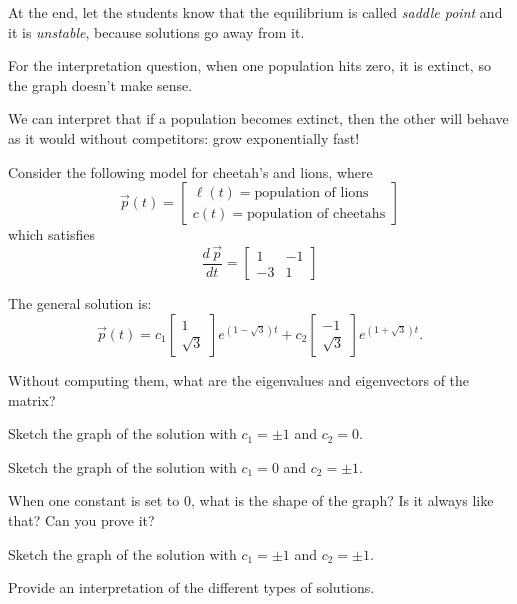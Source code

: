 \begin{annotation}
	\begin{goals}
	\end{goals}
	\begin{goals}
	\Goal{Unstable Saddle Point}
	At the end, let the students know that the equilibrium is called \emph{saddle point} and it is \emph{unstable}, because solutions go away from it.
	
	For the interpretation question, when one population hits zero, it is extinct, so the graph doesn't make sense. 
	
	We can interpret that if a population becomes extinct, then the other will behave as it would without competitors: grow exponentially fast!
	\end{goals}
\end{annotation}
\question \label{sys:phaseportrait-real}
	Consider the following model for cheetah's and lions, where
	$$ \vec{p}(t) = \begin{bmatrix} \ell(t) = \text{population of lions} \\ c(t) = \text{population of cheetahs} \end{bmatrix} $$
	which satisfies
	$$
	\frac{d\,\vec{p}}{dt} = \begin{bmatrix}
 		1 & -1 \\
 		-3 & 1
 	\end{bmatrix}
	$$
	
	The general solution is:
	$$
	\vec{p}(t) = c_1 \begin{bmatrix} 1 \\ \sqrt{3} \end{bmatrix} e^{(1-\sqrt{3})t} + c_2 \begin{bmatrix} -1 \\ \sqrt{3} \end{bmatrix} e^{(1+\sqrt{3})t}.
	$$
\begin{parts}
	\item Without computing them, what are the eigenvalues and eigenvectors of the matrix?
	\item Sketch the graph of the solution with $c_1=\pm 1$ and $c_2=0$.
	\item Sketch the graph of the solution with $c_1=0$ and $c_2=\pm 1$.
	\item When one constant is set to 0, what is the shape of the graph? Is it always like that? Can you prove it?
	\item Sketch the graph of the solution with $c_1=\pm 1$ and $c_2=\pm 1$.
	\item Provide an interpretation of the different types of solutions.
\end{parts}






